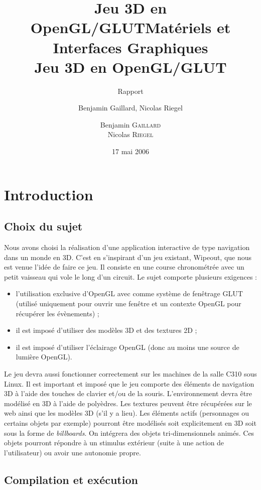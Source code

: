 \documentclass[a4paper,11pt]{report}
\title{Jeu 3D en OpenGL/GLUT}
\author{Benjamin Gaillard, Nicolas Riegel}
\date{17 mai 2006}
\title{{\large Matériels et Interfaces Graphiques}\\Jeu 3D en OpenGL/GLUT}
\subtitle{Rapport}
\author{Benjamin \textsc{Gaillard}\\Nicolas \textsc{Riegel}}
\begin{document}

\maketitle
\tableofcontents



\chapter{Introduction}

\section{Choix du sujet}

Nous avons choisi la réalisation d'une application interactive de type navigation dans un monde en 3D.
C'est en s'inspirant d'un jeu existant, Wipeout, que nous est venue l'idée de faire ce jeu. Il consiste en une
course chronométrée avec un petit vaisseau qui vole le long d'un circuit.
Le sujet comporte plusieurs exigences :
\begin{itemize}
 \item l’utilisation exclusive d’OpenGL avec comme système de fenêtrage GLUT (utilisé uniquement pour ouvrir une fenêtre et un contexte
         OpenGL pour récupérer les évènements) ;
 \item il est imposé d’utiliser des modèles 3D et des textures 2D ;
 \item il est imposé d’utiliser l’éclairage OpenGL (donc au moins une source de lumière OpenGL).
\end{itemize}

\bigskip
Le jeu devra aussi fonctionner correctement sur les machines de la salle C310 sous Linux.
Il est important et imposé que le jeu comporte des éléments de navigation 3D à l’aide des touches de clavier et/ou de la souris.
L’environnement devra être modélisé en 3D à l’aide de polyèdres. Les textures peuvent être récupérées sur le web ainsi que les modèles 3D (s’il
y a lieu). Les éléments actifs (personnages ou certains objets par exemple) pourront être modélisés soit explicitement en 3D soit sous la forme
de \textit{billboards}. On intégrera des objets tri-dimensionnels animés. Ces objets pourront répondre à un stimulus extérieur (suite à une action de
l'utilisateur) ou avoir une autonomie propre.

\section{Compilation et exécution}
\end{document}
